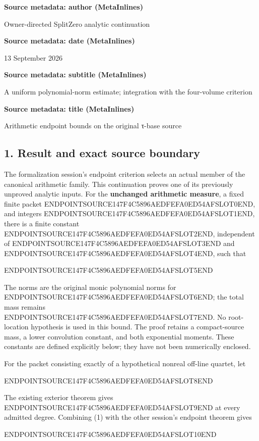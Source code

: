 \textbf{Source metadata: author (MetaInlines)}

Owner-directed SplitZero analytic continuation

\textbf{Source metadata: date (MetaInlines)}

13 September 2026

\textbf{Source metadata: subtitle (MetaInlines)}

A uniform polynomial-norm estimate; integration with the four-volume criterion

\textbf{Source metadata: title (MetaInlines)}

Arithmetic endpoint bounds on the original τ-base source

\subsection{1. Result and exact source boundary}\label{endpoint-arithmetic_original--result-and-exact-source-boundary}

The formalization session's endpoint criterion selects an actual member of the canonical arithmetic family. This continuation proves one of its previously unproved analytic inputs. For the \textbf{unchanged arithmetic measure}, a fixed finite packet ENDPOINTSOURCE147F4C5896AEDFEFA0ED54AFSLOT0END, and integers ENDPOINTSOURCE147F4C5896AEDFEFA0ED54AFSLOT1END, there is a finite constant ENDPOINTSOURCE147F4C5896AEDFEFA0ED54AFSLOT2END, independent of ENDPOINTSOURCE147F4C5896AEDFEFA0ED54AFSLOT3END and ENDPOINTSOURCE147F4C5896AEDFEFA0ED54AFSLOT4END, such that

ENDPOINTSOURCE147F4C5896AEDFEFA0ED54AFSLOT5END

The norms are the original monic polynomial norms for ENDPOINTSOURCE147F4C5896AEDFEFA0ED54AFSLOT6END; the total mass remains ENDPOINTSOURCE147F4C5896AEDFEFA0ED54AFSLOT7END. No root-location hypothesis is used in this bound. The proof retains a compact-source mass, a lower convolution constant, and both exponential moments. These constants are defined explicitly below; they have not been numerically enclosed.

For the packet consisting exactly of a hypothetical nonreal off-line quartet, let

ENDPOINTSOURCE147F4C5896AEDFEFA0ED54AFSLOT8END

The existing exterior theorem gives ENDPOINTSOURCE147F4C5896AEDFEFA0ED54AFSLOT9END at every admitted degree. Combining (1) with the other session's endpoint theorem gives

ENDPOINTSOURCE147F4C5896AEDFEFA0ED54AFSLOT10END

